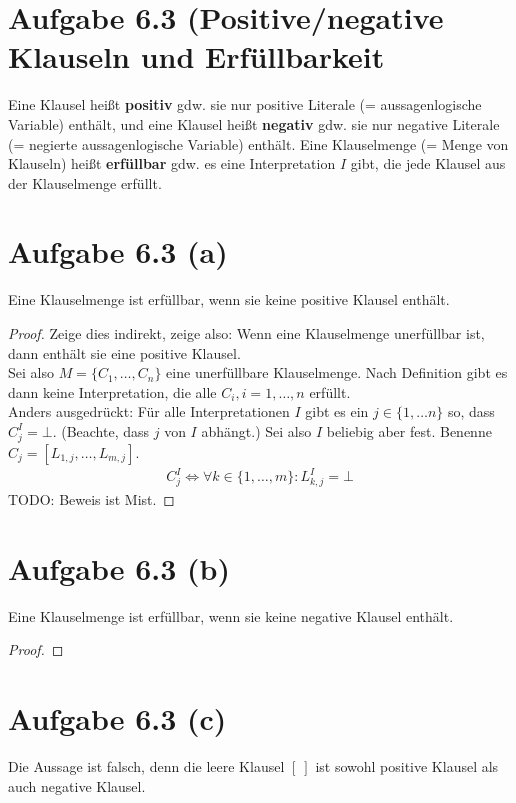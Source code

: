 \documentclass[12pt,a4paper]{article}
\begin{document}
\section{Aufgabe 6.3 (Positive/negative Klauseln und Erfüllbarkeit}
Eine Klausel heißt \textbf{positiv} gdw. sie nur positive Literale (= aussagenlogische Variable) enthält, und eine Klausel heißt \textbf{negativ} gdw. sie nur negative Literale (= negierte aussagenlogische Variable) enthält.\nl
Eine Klauselmenge (= Menge von Klauseln) heißt \textbf{erfüllbar} gdw. es eine Interpretation $I$ gibt, die jede Klausel aus der Klauselmenge erfüllt.

\section*{Aufgabe 6.3 (a)}
Eine Klauselmenge ist erfüllbar, wenn sie keine positive Klausel enthält.

\begin{proof}
Zeige dies indirekt, zeige also: Wenn eine Klauselmenge unerfüllbar ist, dann enthält sie eine positive Klausel.\\
Sei also $M=\lbrace C_1,\ldots,C_n\rbrace$ eine unerfüllbare Klauselmenge. Nach Definition gibt es dann keine Interpretation, die alle $C_i,i=1,\ldots,n$ erfüllt.\\ Anders ausgedrückt: Für alle Interpretationen $I$ gibt es ein $j\in\lbrace1,\ldots n\rbrace$ so, dass $C_j^I=\bot$. (Beachte, dass $j$ von $I$ abhängt.) Sei also $I$ beliebig aber fest. Benenne $C_j=[L_{1,j},\ldots, L_{m,j}]$.
\begin{align*}
C_j^I\Longleftrightarrow\forall k\in\lbrace 1,\ldots,m\rbrace: L_{k,j}^I=\bot
\end{align*}
TODO: Beweis ist Mist.
\end{proof}

\section*{Aufgabe 6.3 (b)}
Eine Klauselmenge ist erfüllbar, wenn sie keine negative Klausel enthält.

\begin{proof}

\end{proof}

\section*{Aufgabe 6.3 (c)}
Die Aussage ist falsch, denn die leere Klausel $[~]$ ist sowohl positive Klausel als auch negative Klausel.
\end{document}
